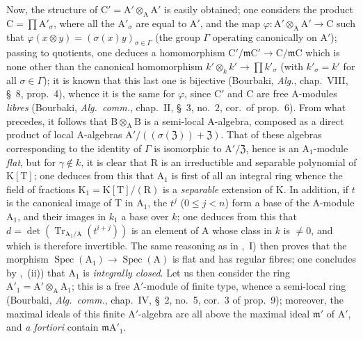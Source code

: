 \begin{env}[11.7.1]
Now, the structure of $\mathrm{C}'=\mathrm{A}'\otimes_\mathrm{A}\mathrm{A}'$ is easily obtained; one considers the product $\mathrm{C}=\prod\mathrm{A}'_\sigma$, where all the $\mathrm{A}'_\sigma$ are equal to $\mathrm{A}'$, and the map $\varphi:\mathrm{A}'\otimes_\mathrm{A}\mathrm{A}'\to\mathrm{C}$ such that $\varphi(x\otimes y)=(\sigma(x)y)_{\sigma\in\Gamma}$ (the group $\Gamma$ operating canonically on $\mathrm{A}'$); passing to quotients, one deduces a homomorphism $\mathrm{C}'/\mathfrak{m}\mathrm{C}'\to\mathrm{C}/\mathfrak{m}\mathrm{C}$ which is none other than the canonical homomorphism $k'\otimes_k k'\to\prod k'_\sigma$ (with $k'_\sigma=k'$ for all $\sigma\in\Gamma$); it is known that this last one is bijective (Bourbaki, \emph{Alg.}, chap.~VIII, \S~8, prop.~4), whence it is the same for $\varphi$, since $\mathrm{C}'$ and $\mathrm{C}$ are free $\mathrm{A}$-modules \emph{libres} (Bourbaki, \emph{Alg.\ comm.}, chap.~II, \S~3, no.~2, cor.\ of prop.~6).
From what precedes, it follows that $\mathrm{B}\otimes_\mathrm{A}\mathrm{B}$ is a semi-local $\mathrm{A}$-algebra, composed as a direct product of local $\mathrm{A}$-algebras $\mathrm{A}'/((\sigma(\mathfrak{Z}))+\mathfrak{Z})$.
That of these algebras corresponding to the identity of $\Gamma$ is isomorphic to $\mathrm{A}'/\mathfrak{Z}$, hence is an $\mathrm{A}_1$-module \emph{flat}, but for $\gamma\notin k$, it is clear that $\mathrm{R}$ is an irreductible and separable polynomial of $\mathrm{K}[\mathrm{T}]$; one deduces from this that $\mathrm{A}_1$ is first of all an integral ring whence the field of fractions $\mathrm{K}_1=\mathrm{K}[\mathrm{T}]/(\mathrm{R})$ is a \emph{separable} extension of $\mathrm{K}$.
In addition, if $t$ is the canonical image of $\mathrm{T}$ in $\mathrm{A}_1$, the $t^j$ ($0\leq j<n$) form a base of the $\mathrm{A}$-module $\mathrm{A}_1$, and their images in $k_1$ a base over $k$; one deduces from this that $d=\det(\operatorname{Tr}_{\mathrm{A}_1/\mathrm{A}}(t^{i+j}))$ is an element of $\mathrm{A}$ whose class in $k$ is $\neq 0$, and which is therefore invertible.
The same reasoning as in ,~I) then proves that the morphism $\operatorname{Spec}(\mathrm{A}_1)\to\operatorname{Spec}(\mathrm{A})$ is flat and has regular fibres; one concludes by ,~(ii)) that $\mathrm{A}_1$ is \emph{integrally closed}.
Let us then consider the ring $\mathrm{A}'_1=\mathrm{A}'\otimes_\mathrm{A}\mathrm{A}_1$; this is a free $\mathrm{A}'$-module of finite type, whence a semi-local ring (Bourbaki, \emph{Alg.\ comm.}, chap.~IV, \S~2, no.~5, cor.~3 of prop.~9); moreover, the maximal ideals of this finite $\mathrm{A}'$-algebra are all above the maximal ideal $\mathfrak{m}'$ of $\mathrm{A}'$, and \emph{a fortiori} contain $\mathfrak{m}\mathrm{A}'_1$.

\end{env}
